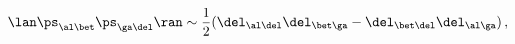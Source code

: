 \begin{equation}  \label{antiprop}
\lan \ps_{\al\bet}\ps_{\ga\del}\ran \sim \frac{1}{2}(\del_{\al\del}\del_{\bet%
\ga} -\del_{\bet\del}\del_{\al\ga})\, ,
\end{equation}

